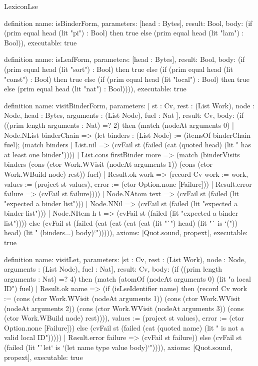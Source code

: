 \begin{lexlean}{LexiconLse}
\begin{semanticmodule}
definition{
  name: isBinderForm,
  parameters: [head : Bytes],
  result: Bool,
  body: (if (prim equal head (lit "pi") : Bool) then true else (prim equal head (lit "lam") : Bool)),
  executable: true
}

definition{
  name: isLeafForm,
  parameters: [head : Bytes],
  result: Bool,
  body: (if (prim equal head (lit "sort") : Bool) then true else (if (prim equal head (lit "const") : Bool) then true else (if (prim equal head (lit "local") : Bool) then true else (prim equal head (lit "nat") : Bool)))),
  executable: true
}

definition{
  name: visitBinderForm,
  parameters: [
    st : Cv,
    rest : (List Work),
    node : Node,
    head : Bytes,
    arguments : (List Node),
    fuel : Nat
  ],
  result: Cv,
  body: (if ((prim length arguments : Nat) =? 2) then (match (nodeAt arguments 0)
    | Node.NList binderChain => (let binders : (List Node) := (itemsOf binderChain fuel); (match binders
      | List.nil => (cvFail st (failed (cat (quoted head) (lit " has at least one binder"))))
      | List.cons firstBinder more => (match (binderVisits binders (cons (ctor Work.WVisit (nodeAt arguments 1)) (cons (ctor Work.WBuild node) rest)) fuel)
        | Result.ok work => (record Cv {work := work, values := (project st values), error := (ctor Option.none [Failure])})
        | Result.error failure => (cvFail st failure))))
    | Node.NAtom text => (cvFail st (failed (lit "expected a binder list")))
    | Node.NNil => (cvFail st (failed (lit "expected a binder list")))
    | Node.NItem h t => (cvFail st (failed (lit "expected a binder list")))) else (cvFail st (failed (cat (cat (cat (cat (lit "`") head) (lit "` is `(")) head) (lit " (binders...) body)`"))))),
  axioms: [Quot.sound, propext],
  executable: true
}

definition{
  name: visitLet,
  parameters: [st : Cv, rest : (List Work), node : Node, arguments : (List Node), fuel : Nat],
  result: Cv,
  body: (if ((prim length arguments : Nat) =? 4) then (match (atomOf (nodeAt arguments 0) (lit "a local ID") fuel)
    | Result.ok name => (if (isLseIdentifier name) then (record Cv {work := (cons (ctor Work.WVisit (nodeAt arguments 1)) (cons (ctor Work.WVisit (nodeAt arguments 2)) (cons (ctor Work.WVisit (nodeAt arguments 3)) (cons (ctor Work.WBuild node) rest)))), values := (project st values), error := (ctor Option.none [Failure])}) else (cvFail st (failed (cat (quoted name) (lit " is not a valid local ID")))))
    | Result.error failure => (cvFail st failure)) else (cvFail st (failed (lit "`let` is `(let name type value body)`")))),
  axioms: [Quot.sound, propext],
  executable: true
}


\end{semanticmodule}
\end{lexlean}
